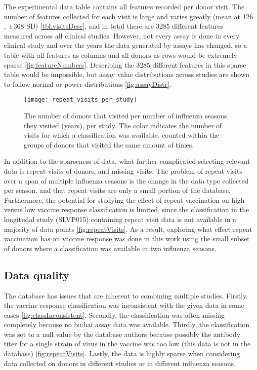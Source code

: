 The experimental data table contains all features recorded per donor visit.
The number of features collected for each visit is large and varies greatly (mean at 126 , \(\pm \)368 SD) \autoref{tbl:visitsDesc}, and in total there are 3285 different features measured across all clinical studies.
However, not every assay is done in every clinical study  and over the years the data generated by assays has changed, so a table with all features as columns and all donors as rows would be extremely sparse \autoref{fig:featureNumbers}.
Describing the 3285 different features in this sparse table would be impossible, but assay value distributions across studies are shown to follow normal or power distributions \autoref{fig:assayDistr}.

\begin{figure}[htpb]
    \texttt{[image: repeat\_visits\_per\_study]}
    \caption{
        The number of donors that visited per number of influenza seasons they visited (years), per study.
        The color indicates the number of visits for which a classification was available, counted within the groups of donors that visited the same amount of times.
    }\label{fig:repeatVisits}
\end{figure}

In addition to the sparseness of data, what further complicated selecting relevant data is repeat visits of donors, and missing visits.
The problem of repeat visits over a span of multiple influenza seasons is the change in the data type collected per season, and that repeat visits are only a small portion of the database.
Furthermore, the potential for studying the effect of repeat vaccination on high versus low vaccine response classification is limited, since the classification in the longitudal study (SLVP015) containing repeat visit data is not available in a majority of data points \autoref{fig:repeatVisits}.
As a result, exploring what effect repeat vaccination has on vaccine response was done in this work using the small subset of donors where a classification was available in two influenza seasons.

\subsection{Data quality}

The database has issues that are inherent to combining multiple studies.
Firstly, the vaccine response classification was inconsistent with the given data in some cases \autoref{fig:classInconsistent}.
Secondly, the classification was often missing completely because no \gls{bu:hai} assay data was available.
Thirdly, the classification was set to a null value by the database authors because possibly the antibody titer for a single strain of virus in the vaccine was too low (this data is not in the database) \autoref{fig:repeatVisits}.
Lastly, the data is highly sparse when considering data collected on donors in different studies or in different influenza seasons.

